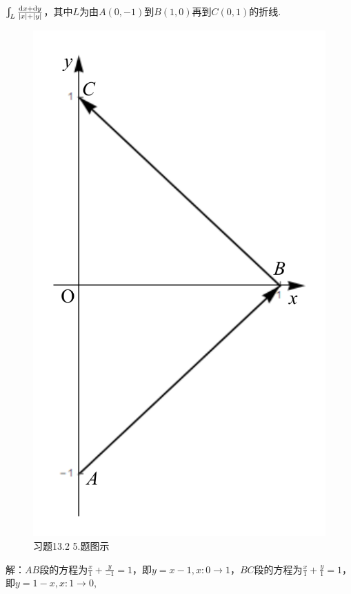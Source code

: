 \documentclass[12pt,UTF8]{ctexart}
\newcommand{\BLInt}[2]{\varint\nolimits_{#1}#2}
\begin{document}
\begin{enumerate}
$\BLInt L{\frac{\mathrm dx+\mathrm dy}{|x|+|y|}}$，其中$L$为由$A(0,-1)$到$B(1,0)$再到$C(0,1)$的折线.

\begin{figure}[H]
\begin{center}
\includegraphics[height=0.3\textheight]{Figures22/Fig13-2-5.pdf}
\end{center}
\caption{习题13.2 5.题图示}
\label{13-2-5}
\end{figure}

解：$AB$段的方程为$\frac x1+\frac y{-1}=1$，即$y=x-1,x:0\rightarrow1$，$BC$段的方程为$\frac x1+\frac y1=1$，即$y=1-x,x:1\rightarrow0$,


\end{enumerate}
\end{document}
